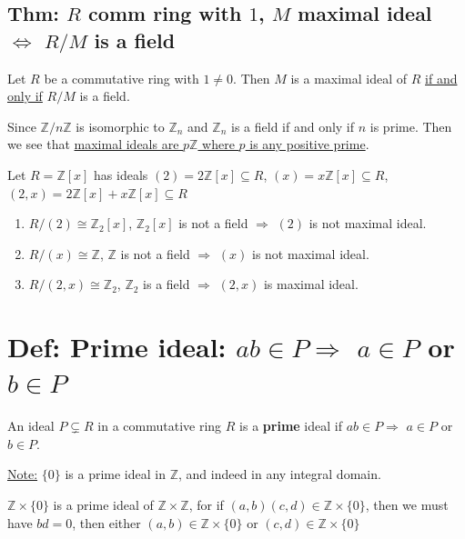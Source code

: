 \documentclass[11pt]{elegantbook}
\begin{document}
\subsection{Thm: $R$ comm ring with $1$, $M$ maximal ideal $\Leftrightarrow$ $R/M$ is a field}
\begin{theorem}
    Let $R$ be a commutative ring with $1\neq 0$. Then $M$ is a maximal ideal of $R$ \underline{if and only if} $R/M$ is a field.
\end{theorem}
\begin{example}
    Since $\mathbb{Z}/n \mathbb{Z}$ is isomorphic to $\mathbb{Z}_n$ and $\mathbb{Z}_n$ is a field if and only if $n$ is prime. Then we see that \underline{maximal ideals are $p \mathbb{Z}$ where $p$ is any positive prime}.
\end{example}
\begin{example}
    Let $R=\mathbb{Z}[x]$ has ideals $(2)=2 \mathbb{Z}[x]\subseteq R$, $(x)=x \mathbb{Z}[x]\subseteq R$, $(2,x)=2\mathbb{Z}[x]+x\mathbb{Z}[x]\subseteq R$
    \begin{enumerate}[$(1)$]
        \item $R/(2) \cong \mathbb{Z}_2[x]$, $\mathbb{Z}_2[x]$ is not a field $\Rightarrow$ $(2)$ is not maximal ideal.
        \item $R/(x) \cong \mathbb{Z}$, $\mathbb{Z}$ is not a field $\Rightarrow$ $(x)$ is not maximal ideal.
        \item $R/(2,x) \cong \mathbb{Z}_2$, $\mathbb{Z}_2$ is a field $\Rightarrow$ $(2,x)$ is maximal ideal.
    \end{enumerate}
\end{example}

\section{Def: Prime ideal: $ab\in P \Rightarrow $ $a\in P$ or $b\in P$}
\begin{definition}
    An ideal $P\subsetneq R$ in a commutative ring $R$ is a \textbf{prime} ideal if $ab\in P \Rightarrow $ $a\in P$ or $b\in P$.
\end{definition}
\underline{Note:} $\{0\}$ is a prime ideal in $\mathbb{Z}$, and indeed in any integral domain.

\begin{example}
    $\mathbb{Z}\times \{0\}$ is a prime ideal of $\mathbb{Z}\times \mathbb{Z}$, for if $(a,b)(c,d)\in \mathbb{Z}\times \{0\}$, then we must have $bd=0$, then either $(a,b)\in \mathbb{Z}\times \{0\}$ or $(c,d)\in \mathbb{Z}\times \{0\}$
\end{example}
\end{document}
